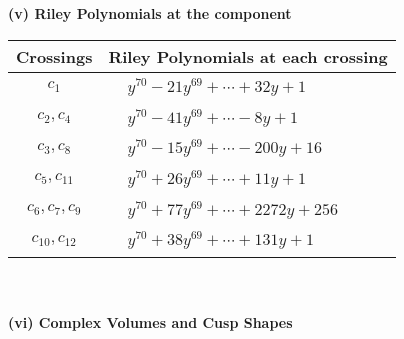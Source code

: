 \documentclass[1p]{elsarticle_modified}
\theoremstyle{definition}
\begin{document}
\newpage\renewcommand{\arraystretch}{1}
\flushleft \textbf{(v) Riley Polynomials at the component}\newline \\
\begin{tabular}{m{50pt}|m{274pt}}
Crossings & \hspace{64pt}Riley Polynomials at each crossing \\
\hline $$\begin{aligned}c_{1}\end{aligned}$$&$\begin{aligned}
&y^{70}-21 y^{69}+\cdots+32 y+1
\end{aligned}$\\
\hline $$\begin{aligned}c_{2},c_{4}\end{aligned}$$&$\begin{aligned}
&y^{70}-41 y^{69}+\cdots-8 y+1
\end{aligned}$\\
\hline $$\begin{aligned}c_{3},c_{8}\end{aligned}$$&$\begin{aligned}
&y^{70}-15 y^{69}+\cdots-200 y+16
\end{aligned}$\\
\hline $$\begin{aligned}c_{5},c_{11}\end{aligned}$$&$\begin{aligned}
&y^{70}+26 y^{69}+\cdots+11 y+1
\end{aligned}$\\
\hline $$\begin{aligned}c_{6},c_{7},c_{9}\end{aligned}$$&$\begin{aligned}
&y^{70}+77 y^{69}+\cdots+2272 y+256
\end{aligned}$\\
\hline $$\begin{aligned}c_{10},c_{12}\end{aligned}$$&$\begin{aligned}
&y^{70}+38 y^{69}+\cdots+131 y+1
\end{aligned}$\\
\hline
\end{tabular}\\~\\
\newpage\flushleft \textbf{(vi) Complex Volumes and Cusp Shapes}
\end{document}
